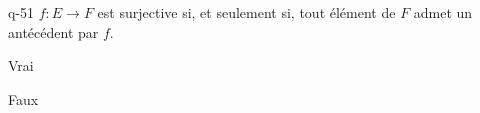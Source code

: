 \begin{truefalse}{q-51}
$f:E\to F$ est surjective si, et seulement si, tout élément de $F$ admet un antécédent par $f$.
\item* Vrai
\item Faux
\end{truefalse}

